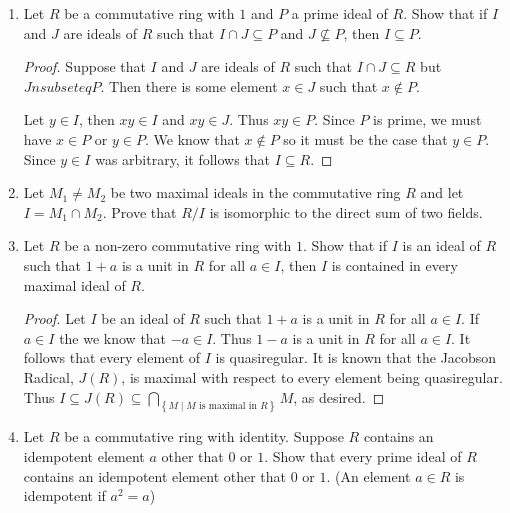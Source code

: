 \documentclass{article}
\theoremstyle{definition}
\newcommand{\set}[1]{\left\{#1\right\}}
\begin{document}
\begin{enumerate}
\begin{proof}
            \end{proof}
            
            \item Let $R$ be a commutative ring with $1$ and $P$ a prime ideal of $R$. Show that if $I$ and $J$ are ideals of $R$ such that $I\cap J \subseteq P$ and $J\nsubseteq P$, then $I\subseteq P$.
            
            \begin{proof}
                Suppose that $I$ and $J$ are ideals of $R$ such that $I \cap J \subseteq R$ but $J nsubseteq P$. Then there is some element $x\in J$ such that $x\notin P$. 
                
                Let $y\in I$, then $xy\in I$ and $xy\in J$. Thus $xy\in P$. Since $P$ is prime, we must have $x\in P$ or $y\in P$. We know that $x\notin P$ so it must be the case that $y\in P$. Since $y\in I$ was arbitrary, it follows that $I\subseteq R$. 
            \end{proof}
            
            \item Let $M_1 \neq M_2$ be two maximal ideals in the commutative ring $R$ and let $I=M_1\cap M_2$. Prove that $R/I$ is isomorphic to the direct sum of two fields. 
            

            \item Let $R$ be a non-zero commutative ring with $1$. Show that if $I$ is an ideal of $R$ such that $1+a$ is a unit in $R$ for all $a\in I$, then $I$ is contained in every maximal ideal of $R$.
            
            \begin{proof}
                Let $I$ be an ideal of $R$ such that $1+a$ is a unit in $R$ for all $a\in I$. If $a\in I$ the we know that $-a\in I$. Thus $1-a$ is a unit in $R$ for all $a\in I$. It follows that every element of $I$ is quasiregular. It is known that the Jacobson Radical, $J(R)$, is maximal with respect to every element being quasiregular. Thus $I\subseteq J(R) \subseteq \bigcap_{\set{M\mid M \text{ is maximal in } R}}M$, as desired.
            \end{proof}

            \item Let $R$ be a commutative ring with identity. Suppose $R$ contains an idempotent element $a$ other that $0$ or $1$. Show that every prime ideal of $R$ contains an idempotent element other that $0$ or $1$. (An element $a\in R$ is idempotent if $a^2=a$)
            

\end{enumerate}
\end{document}
